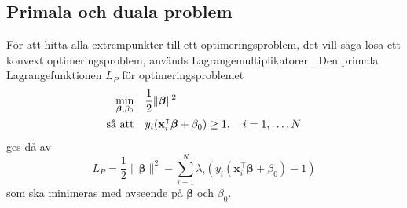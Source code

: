 \documentclass[a4paper, 12pt]{report}
\theoremstyle{definition}
\theoremstyle{remark}
\newcommand{\bfbeta}{{\boldsymbol{\beta}}}
\begin{document}
\subsection{Primala och duala problem}

För att hitta alla extrempunkter till ett optimeringsproblem, det vill säga lösa ett konvext optimeringsproblem, används Lagrangemultiplikatorer \cite{Boyd}.
Den primala Lagrangefunktionen $L_P$ för optimeringsproblemet
\begin{equation*}
\begin{aligned}
\operatornamewithlimits{min}_{\bfbeta,\beta_0} & & &\frac{1}{2}\|\bfbeta\|^2\\
\text{så att} & & &y_i(\mathbf{x}_i^\intercal\bfbeta+\beta_0)\geq 1,\quad i=1,\dots,N
\end{aligned}
\end{equation*}
ges då av
\begin{equation}\label{eq:primallagrange}
L_P=\frac{1}{2}\|\bfbeta\|^2 - \sum_{i=1}^{N} \lambda_i\left(y_i \left(\mathbf{x}_i^\intercal\bfbeta + \beta_0\right)-1\right)
\end{equation}
som ska minimeras med avseende på $\bfbeta$ och $\beta_0$.
\end{document}
